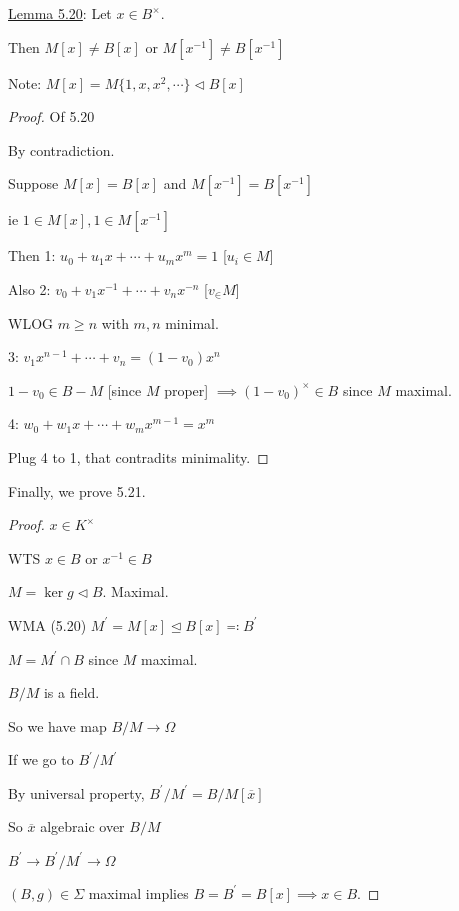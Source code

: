 \documentclass{article}
\theoremstyle{definition}
\begin{document}
\underline{Lemma 5.20}: Let \(x\in B^\times\).

Then \(M[x] \neq B[x]\) or \(M[x ^{-1} ] \neq B[x ^{-1}]\) 

Note: \(M[x] = M \{ 1,x,x^2,\cdots \} \triangleleft B[x] \) 

\begin{proof}
    Of 5.20

    By contradiction.

    Suppose \(M[x]=B[x]\) and \(M[x ^{-1}] = B[x ^{-1}]\) 

    ie \(1\in M[x], 1\in M[x ^{-1}]\)
    
    Then 1: \(u_0 + u_1 x + \cdots + u_m x^m = 1\) [\(u_i\in M\)]

    Also 2: \(v_0 + v_1 x ^{-1} + \cdots + v_n x^{-n}\) [\(v_\in M\)]
    
    WLOG \( m \geq n\) with \(m,n\) minimal.

    3: \(v_1 x^{n-1} + \cdots + v_n = (1-v_0)x^n \)
    
    \(1-v_0\in B - M\) [since \(M\) proper] \( \implies (1-v_0)^\times \in B\) since \(M\) maximal.

    4: \(w_0 + w_1 x + \cdots + w_m x^{m-1}=x^m\) 

    Plug 4 to 1, that contradits minimality. 
    
\end{proof}

Finally, we prove 5.21.

\begin{proof}
    \(x\in K ^\times\)
    
    WTS \(x\in B\) or \(x ^{-1} \in B\) 

    \(M = \ker g \triangleleft B\). Maximal.
    
    WMA (5.20) \(M^{\prime} = M[x] \trianglelefteq B[x]\eqqcolon B^{\prime} \)
    
    \(M = M^{\prime} \cap B\) since \(M\) maximal.
    
    \(B / M\) is a field.

    So we have map \(B / M \to \Omega\)
    
    If we go to \(B^{\prime} / M^{\prime}\) 
    
    By universal property, \(B^{\prime} / M^{\prime} = B / M [\overline{x}]\) 

    So \(\overline{x}\) algebraic over \(B / M\) 

    \(B^{\prime}  \to B^{\prime} / M^{\prime} \to \Omega\)
    
    \((B,g)\in \Sigma\) maximal implies \(B = B^{\prime} = B[x] \implies x\in B\).  

\end{proof}
\end{document}
